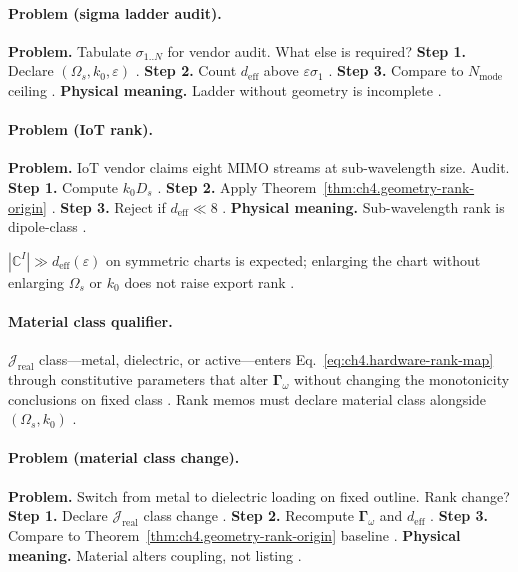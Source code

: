 \paragraph{Problem (sigma ladder audit).}
\textbf{Problem.} Tabulate \(\sigma_{1..N}\) for vendor audit. What else is required?
\textbf{Step 1.} Declare \((\Omega_{s},k_{0},\varepsilon)\) \cite{stratton1941,harrington2001}.
\textbf{Step 2.} Count \(d_{\mathrm{eff}}\) above \(\varepsilon\sigma_{1}\) \cite{hansen1988,devaney2004}.
\textbf{Step 3.} Compare to \(N_{\mathrm{mode}}\) ceiling \cite{jackson1999,collin2001}.
\textbf{Physical meaning.} Ladder without geometry is incomplete \cite{harrington2001}.

\paragraph{Problem (IoT rank).}
\textbf{Problem.} IoT vendor claims eight MIMO streams at sub-wavelength size. Audit.
\textbf{Step 1.} Compute \(k_{0}D_{s}\) \cite{jackson1999,harrington2001}.
\textbf{Step 2.} Apply Theorem~\ref{thm:ch4.geometry-rank-origin} \cite{stratton1941,hansen1988}.
\textbf{Step 3.} Reject if \(d_{\mathrm{eff}}\ll8\) \cite{devaney2004,collin2001}.
\textbf{Physical meaning.} Sub-wavelength rank is dipole-class \cite{harrington2001,stratton1941}.

\begin{corollary}
\label{cor:ch4.listing-excess-no-rank}
\(|\mathbb{C}^{I}|\gg d_{\mathrm{eff}}(\varepsilon)\) on symmetric charts is expected; enlarging the chart without enlarging \(\Omega_{s}\) or \(k_{0}\)
does not raise export rank \cite{hansen1988,harrington2001,stratton1941,devaney2004}.
\end{corollary}

\paragraph{Material class qualifier.}
\(\mathcal{J}_{\mathrm{real}}\) class---metal, dielectric, or active---enters Eq.~\eqref{eq:ch4.hardware-rank-map} through constitutive parameters that alter
\(\boldsymbol{\Gamma}_\omega\) without changing the monotonicity conclusions on fixed class \cite{stratton1941,harrington2001,hansen1988,jackson1999,devaney2004,collin2001}.
Rank memos must declare material class alongside \((\Omega_{s},k_{0})\) \cite{harrington2001,stratton1941}.

\paragraph{Problem (material class change).}
\textbf{Problem.} Switch from metal to dielectric loading on fixed outline. Rank change?
\textbf{Step 1.} Declare \(\mathcal{J}_{\mathrm{real}}\) class change \cite{stratton1941,harrington2001}.
\textbf{Step 2.} Recompute \(\boldsymbol{\Gamma}_\omega\) and \(d_{\mathrm{eff}}\) \cite{hansen1988,devaney2004}.
\textbf{Step 3.} Compare to Theorem~\ref{thm:ch4.geometry-rank-origin} baseline \cite{jackson1999,collin2001}.
\textbf{Physical meaning.} Material alters coupling, not listing \cite{harrington2001,stratton1941}.

